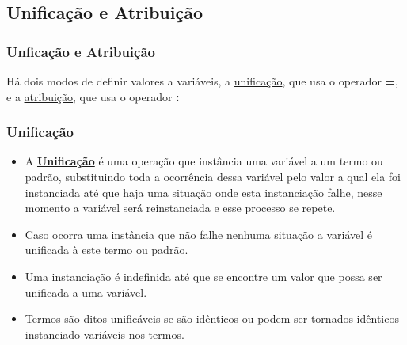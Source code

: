 
\subsection{Unificação e Atribuição}

\begin{frame}
	\frametitle{Unficação e Atribuição}
	Há dois modos de definir valores a variáveis, a \underline{unificação}, que usa o operador 
	\textbf{=}, e a \underline{atribuição}, que usa o operador \textbf{:=}
\end{frame}


\begin{frame}[fragile]
	\frametitle{Unificação}
	\begin{itemize}
		
		\item A \textbf{\underline{Unificação}} é uma operação que instância uma variável a um termo ou 
		padrão, substituindo toda a ocorrência dessa variável pelo valor a qual ela foi instanciada até que
		haja uma situação onde esta instanciação falhe, nesse momento a variável será reinstanciada e
		esse processo se repete.
		
		\item Caso ocorra uma instância que não falhe nenhuma situação a variável é unificada à este termo
		ou padrão.
		
		\item Uma instanciação é indefinida até que se encontre um valor que possa ser unificada a uma
		variável.
        
        \item Termos são ditos unificáveis se são idênticos ou podem ser tornados idênticos instanciado 
        variáveis nos termos.
		
	\end{itemize}
	
\end{frame}


